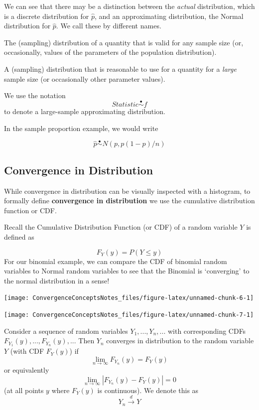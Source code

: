 \documentclass[
]{article}
\providecommand{\tightlist}{%
  \setlength{\itemsep}{0pt}\setlength{\parskip}{0pt}}
\begin{document}
We can see that there may be a distinction between the \emph{actual}
distribution, which is a discrete distribution for \(\hat{p}\), and an
approximating distribution, the Normal distribution for \(\hat{p}\). We
call these by different names.

\begin{description}
\tightlist
\item[Exact Distribution]
The (sampling) distribution of a quantity that is valid for any sample
size (or, occasionally, values of the parameters of the population
distribution).
\item[Large-Sample or Approximate Distribution]
A (sampling) distribution that is reasonable to use for a quantity for a
\emph{large} sample size (or occasionally other parameter values).
\end{description}

We use the notation \[Statistic \stackrel{\bullet}\sim f\] to denote a
large-sample approximating distribution.

In the sample proportion example, we would write

\[\hat{p}\stackrel{\bullet}\sim N(p, p(1-p)/n)\]

\hypertarget{convergence-in-distribution}{%
\subsection{Convergence in
Distribution}\label{convergence-in-distribution}}

While convergence in distribution can be visually inspected with a
histogram, to formally define \textbf{convergence in distribution} we
use the cumulative distribution function or CDF.

Recall the Cumulative Distribution Function (or CDF) of a random
variable \(Y\) is defined as

\[F_Y(y) = P(Y\leq y)\] For our binomial example, we can compare the CDF
of binomial random variables to Normal random variables to see that the
Binomial is `converging' to the normal distribution in a sense!

\texttt{[image: ConvergenceConceptsNotes\_files/figure-latex/unnamed-chunk-6-1]}

\texttt{[image: ConvergenceConceptsNotes\_files/figure-latex/unnamed-chunk-7-1]}

\begin{description}
\tightlist
\item[Convergence in Distribution]
Consider a sequence of random variables \(Y_1,...,Y_n,...\) with
corresponding CDFs \(F_{Y_1}(y), ..., F_{Y_n}(y),..\). Then \(Y_n\)
converges in distribution to the random variable \(Y\) (with CDF
\(F_Y(y)\)) if \[\lim_{n \rightarrow \infty} F_{Y_n}(y)=F_{Y}(y)\] or
equivalently \[\lim_{n \rightarrow \infty} |F_{Y_n}(y)-F_{Y}(y)|=0\] (at
all points \(y\) where \(F_Y(y)\) is continuous). We denote this as
\[Y_n\stackrel{d}\rightarrow Y\]
\end{description}
\end{document}

